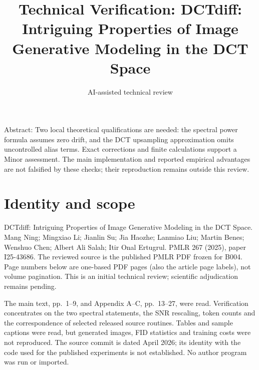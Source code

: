 \documentclass[10pt]{article}
\title{Technical Verification: DCTdiff: Intriguing Properties of Image Generative Modeling in the DCT Space}
\author{AI-assisted technical review}
\date{}
\begin{document}
\maketitle
Abstract: Two local theoretical qualifications are needed: the spectral power formula assumes zero drift, and the DCT upsampling approximation omits uncontrolled alias terms. Exact corrections and finite calculations support a Minor assessment. The main implementation and reported empirical advantages are not falsified by these checks; their reproduction remains outside this review.\par
\section*{Identity and scope}
DCTdiff: Intriguing Properties of Image Generative Modeling in the DCT Space. Mang Ning; Mingxiao Li; Jianlin Su; Jia Haozhe; Lanmiao Liu; Martin Benes; Wenshuo Chen; Albert Ali Salah; Itir Onal Ertugrul. PMLR 267 (2025), paper I25-43686. The reviewed source is the published PMLR PDF frozen for B004. Page numbers below are one-based PDF pages (also the article page labels), not volume pagination. This is an initial technical review; scientific adjudication remains pending.\par
The main text, pp. 1–9, and Appendix A–C, pp. 13–27, were read. Verification concentrates on the two spectral statements, the SNR rescaling, token counts and the correspondence of selected released source routines. Tables and sample captions were read, but generated images, FID statistics and training costs were not reproduced. The source commit is dated April 2026; its identity with the code used for the published experiments is not established. No author program was run or imported.\par
\end{document}
